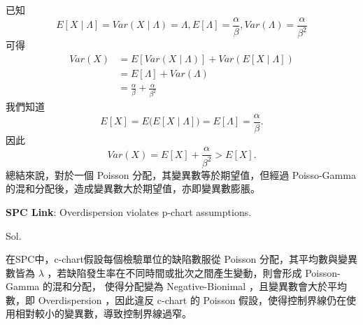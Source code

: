 \documentclass[a4paper, 12pt]{article}  %
\begin{document}
\begin{enumerate}
        已知 $$E[X \mid \Lambda]=Var(X \mid \Lambda)=\Lambda,　E[\Lambda]=\frac{\alpha}{\beta},　Var(\Lambda)=\frac{\alpha}{\beta^{2}}$$
        可得
        \begin{align*}
            Var(X)
            &=E\left[Var(X\mid \Lambda)\right]+Var\left(E[X\mid \Lambda]\right) \\
            &=E[\Lambda]+Var(\Lambda) \\
            &=\frac{\alpha}{\beta}+\frac{\alpha}{\beta^{2}}
        \end{align*}
        我們知道
        $$E[X]=E\big(E[X \mid \Lambda]\big)=E[\Lambda]=\frac{\alpha}{\beta}.$$
        因此
        $$Var(X)=E[X]+\frac{\alpha}{\beta^{2}}>E[X].$$
        總結來說，對於一個 Poisson 分配，其變異數等於期望值，但經過 Poisso-Gamma 的混和分配後，造成變異數大於期望值，亦即變異數膨脹。
    \end{enumerate}

    \textbf{SPC Link}: Overdispersion violates p-chart assumptions.

    Sol.

    在SPC中，c-chart假設每個檢驗單位的缺陷數服從 Poisson 分配，其平均數與變異數皆為 $\lambda$ ，若缺陷發生率在不同時間或批次之間產生變動，則會形成 Poisson-Gamma 的混和分配，
    使得分配變為 Negative-Bionimal ，且變異數會大於平均數，即 Overdispersion ，因此違反 c-chart 的 Poisson 假設，使得控制界線仍在使用相對較小的變異數，導致控制界線過窄。
\end{document}
